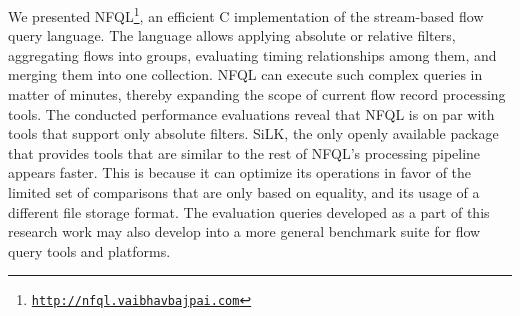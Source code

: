 We presented \ac{NFQL}\footnote{\texttt{\url{http://nfql.vaibhavbajpai.com}}},
an efficient C implementation of the stream-based flow query language. The
language allows applying absolute or relative filters, aggregating flows into
groups, evaluating timing relationships among them, and merging them into one
collection. \ac{NFQL} can execute such complex queries in matter of minutes,
thereby expanding the scope of current flow record processing tools.  The
conducted performance evaluations reveal that \ac{NFQL} is on par with tools
that support only absolute filters. SiLK, the only openly available package
that provides tools that are similar to the rest of \ac{NFQL}'s processing
pipeline appears faster. This is because it can optimize its operations in
favor of the limited set of comparisons that are only based on equality, and
its usage of a different file storage format. The evaluation queries developed
as a part of this research work may also develop into a more general benchmark
suite for flow query tools and platforms.
